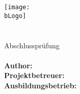 \begin{titlepage}
    \begin{center}
        \thispagestyle{empty}
        \texttt{[image: \\bLogo]}\\[14ex]

        \LARGE{\pDoku}\\
        \Large{\aBeruf}\\
        \Large{Abschlussprüfung \pTermin}\\[8ex]
        
        \LARGE{\textbf{\pTitle}}\\[8ex]

        \normalsize
        \Large{\textbf{Author:} \aName}\\
        \textbf{Projektbetreuer:} \bBetreuer\\[4ex]

        \textbf{Ausbildungsbetrieb:}\\
        \bName\\
        \bStrasse\\
        \bOrt\\[4ex]

    \end{center}
\end{titlepage}